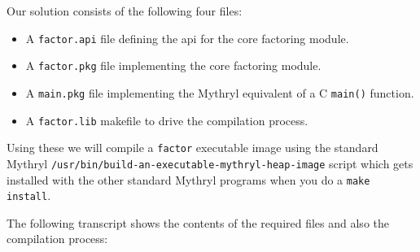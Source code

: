 Our solution consists of the following four files:
\begin{itemize}
\item A {\tt factor.api} file defining the api for the core factoring module.
\item A {\tt factor.pkg} file implementing the core factoring module.
\item A {\tt main.pkg} file implementing the Mythryl equivalent of a C {\tt main()} function.
\item A {\tt factor.lib} makefile to drive the compilation process.
\end{itemize}

Using these we will compile a {\tt factor} executable image using 
the standard Mythryl {\tt /usr/bin/build-an-executable-mythryl-heap-image} 
script which gets installed with the other standard Mythryl programs 
when you do a {\tt make install}.

The following transcript shows the contents of the required files and 
also the compilation process:

